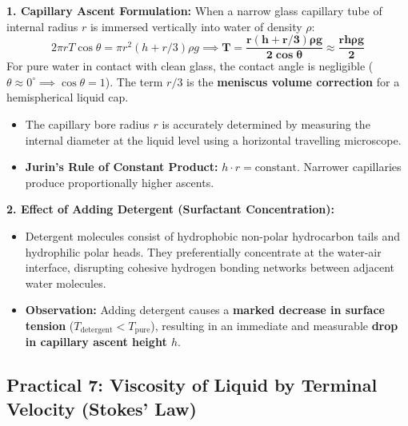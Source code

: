 \documentclass[10pt,twoside,openright]{book}
\begin{document}
\begin{formulabox}
\textbf{1. Capillary Ascent Formulation:}
When a narrow glass capillary tube of internal radius $r$ is immersed vertically into water of density $\rho$:
\begin{equation}
  2\pi r T \cos\theta = \pi r^2 (h + r/3) \rho g \implies \mathbf{T = \frac{r (h + r/3)\rho g}{2\cos\theta}} \approx \mathbf{\frac{r h \rho g}{2}}
\end{equation}
For pure water in contact with clean glass, the contact angle is negligible ($\theta \approx 0^\circ \implies \cos\theta = 1$). The term $r/3$ is the \textbf{meniscus volume correction} for a hemispherical liquid cap.
\begin{itemize}
  \item The capillary bore radius $r$ is accurately determined by measuring the internal diameter at the liquid level using a horizontal travelling microscope.
  \item \textbf{Jurin's Rule of Constant Product:} $h \cdot r = \text{constant}$. Narrower capillaries produce proportionally higher ascents.
\end{itemize}
\textbf{2. Effect of Adding Detergent (Surfactant Concentration):}
\begin{itemize}
  \item Detergent molecules consist of hydrophobic non-polar hydrocarbon tails and hydrophilic polar heads. They preferentially concentrate at the water-air interface, disrupting cohesive hydrogen bonding networks between adjacent water molecules.
  \item \textbf{Observation:} Adding detergent causes a \textbf{marked decrease in surface tension} ($T_{\text{detergent}} < T_{\text{pure}}$), resulting in an immediate and measurable \textbf{drop in capillary ascent height $h$}.
\end{itemize}
\end{formulabox}

\subsection{Practical 7: Viscosity of Liquid by Terminal Velocity (Stokes' Law)}
\end{document}
